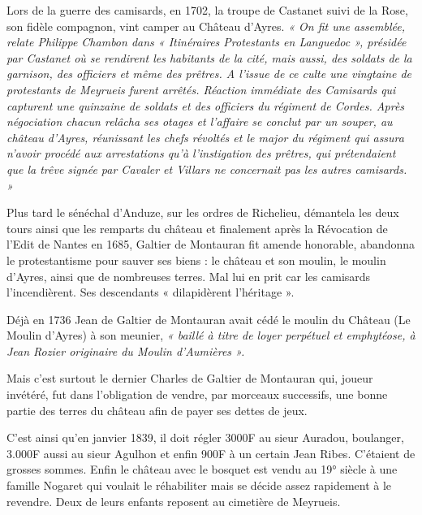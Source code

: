\medskip

Lors de la guerre des camisards, en 1702, la troupe de Castanet suivi de la Rose, son fidèle
compagnon, vint camper au Château d’Ayres. \textit{« On fit une assemblée, relate Philippe
Chambon dans « Itinéraires Protestants en Languedoc », présidée par Castanet où se
rendirent les habitants de la cité, mais aussi, des soldats de la garnison, des officiers et même
des prêtres. A l’issue de ce culte une vingtaine de protestants de Meyrueis furent arrêtés.
Réaction immédiate des Camisards qui capturent une quinzaine de soldats et des officiers du
régiment de Cordes. Après négociation chacun relâcha ses otages et l’affaire se conclut par un souper, au château
d’Ayres, réunissant les chefs révoltés et le major du régiment qui assura n’avoir procédé aux
arrestations qu’à l’instigation des prêtres, qui prétendaient que la trêve signée par Cavaler et
Villars ne concernait pas les autres camisards. »}

\medskip

Plus tard le sénéchal d’Anduze, sur les ordres de Richelieu, démantela les deux tours ainsi que
les remparts du château et finalement après la Révocation de l’Edit de Nantes en 1685, Galtier
de Montauran fit amende honorable, abandonna le protestantisme pour sauver ses biens : le
château et son moulin, le moulin d’Ayres, ainsi que de nombreuses terres.
Mal lui en prit car les camisards l’incendièrent. Ses descendants « dilapidèrent l’héritage ».

\medskip

Déjà en 1736 Jean de Galtier de Montauran avait cédé le moulin du Château (Le Moulin
d’Ayres) à son meunier, \textit{« baillé à titre de loyer perpétuel et emphytéose, à Jean Rozier
originaire du Moulin d’Aumières ».}

\medskip

Mais c’est surtout le dernier Charles de Galtier de Montauran qui, joueur invétéré, fut dans
l’obligation de vendre, par morceaux successifs, une bonne partie des terres du château afin
de payer ses dettes de jeux.

\medskip

C’est ainsi qu’en janvier 1839, il doit régler 3000F au sieur Auradou, boulanger, 3.000F aussi
au sieur Agulhon et enfin 900F à un certain Jean Ribes. C’étaient de grosses sommes. Enfin le
château avec le bosquet est vendu au 19° siècle à une famille Nogaret qui voulait le
réhabiliter mais se décide assez rapidement à le revendre. Deux de leurs enfants reposent au
cimetière de Meyrueis.

